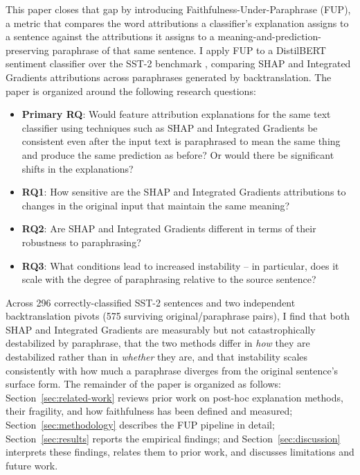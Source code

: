 This paper closes that gap by introducing Faithfulness-Under-Paraphrase
(FUP), a metric that compares the word attributions a classifier's
explanation assigns to a sentence against the attributions it assigns to
a meaning-and-prediction-preserving paraphrase of that same sentence. I
apply FUP to a DistilBERT sentiment classifier \citep{sanh2019distilbert}
over the SST-2 benchmark \citep{socher2013recursive}, comparing SHAP and
Integrated Gradients attributions across paraphrases generated by
backtranslation. The paper is organized around the following research
questions:

\begin{itemize}
  \item \textbf{Primary RQ}: Would feature attribution explanations for
  the same text classifier using techniques such as SHAP and Integrated
  Gradients be consistent even after the input text is paraphrased to
  mean the same thing and produce the same prediction as before? Or
  would there be significant shifts in the explanations?
  \item \textbf{RQ1}: How sensitive are the SHAP and Integrated Gradients
  attributions to changes in the original input that maintain the same
  meaning?
  \item \textbf{RQ2}: Are SHAP and Integrated Gradients different in
  terms of their robustness to paraphrasing?
  \item \textbf{RQ3}: What conditions lead to increased instability --
  in particular, does it scale with the degree of paraphrasing relative
  to the source sentence?
\end{itemize}

Across 296 correctly-classified SST-2 sentences and two independent
backtranslation pivots (575 surviving original/paraphrase pairs), I find
that both SHAP and Integrated Gradients are measurably but not
catastrophically destabilized by paraphrase, that the two methods differ
in \emph{how} they are destabilized rather than in \emph{whether} they
are, and that instability scales consistently with how much a paraphrase
diverges from the original sentence's surface form. The remainder of the
paper is organized as follows: Section~\ref{sec:related-work} reviews
prior work on post-hoc explanation methods, their fragility, and how
faithfulness has been defined and measured; Section~\ref{sec:methodology}
describes the FUP pipeline in detail; Section~\ref{sec:results} reports
the empirical findings; and Section~\ref{sec:discussion} interprets
these findings, relates them to prior work, and discusses limitations
and future work.

